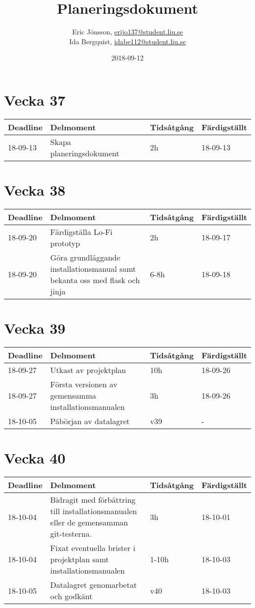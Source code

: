 \documentclass{TDP003mall}
\author{Eric Jönsson, \url{erijo137@student.liu.se}\\
  Ida Bergquist, \url{idabe112@student.liu.se}}
\title{Planeringsdokument}
\date{2018-09-12}
\begin{document}
\projectpage
\section{Vecka 37}
\begin{table}[!h]
\begin{tabularx}{\linewidth}{l|X|l|l}
\hline
Deadline & Delmoment & Tidsåtgång & Färdigställt\\\hline
18-09-13 & Skapa planeringsdokument & 2h & 18-09-13  \\\hline
\end{tabularx}
\end{table}
 

\section{Vecka 38}
\begin{table}[!h]
\begin{tabularx}{\linewidth}{l|X|l|l}
\hline
Deadline & Delmoment & Tidsåtgång & Färdigställt\\\hline
18-09-20 & Färdigställa Lo-Fi prototyp & 2h & 18-09-17  \\\hline
18-09-20 & Göra grundläggande installationsmanual samt bekanta
oss med flask och jinja & 6-8h & 18-09-18 \\\hline
\end{tabularx}
\end{table}

\section{Vecka 39}
\begin{table}[!h]
\begin{tabularx}{\linewidth}{l|X|l|l}
\hline
Deadline & Delmoment & Tidsåtgång & Färdigställt\\\hline
18-09-27 & Utkast av projektplan & 10h & 18-09-26  \\\hline
18-09-27 & Första versionen av gemensamma installationsmanualen
& 3h & 18-09-26 \\\hline
18-10-05 & Påbörjan av datalagret & v39 & - \\\hline
\end{tabularx}
\end{table}

\section{Vecka 40}
\begin{table}[!h]
\begin{tabularx}{\linewidth}{l|X|l|l}
\hline
Deadline & Delmoment & Tidsåtgång & Färdigställt\\\hline
18-10-04 & Bidragit med förbättring till installationsmanualen
eller de gemensamman git-testerna.& 3h & 18-10-01  \\\hline
18-10-04 & Fixat eventuella brister i projektplan samt installationsmanualen & 1-10h & 18-10-03 \\\hline
18-10-05 & Datalagret genomarbetat och godkänt & v40 & 18-10-03 \\\hline
\end{tabularx}
\end{table}
\end{document}
